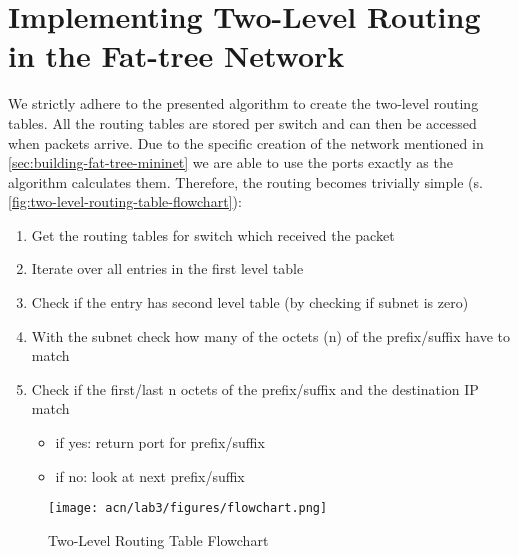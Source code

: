 \documentclass[a4paper,11pt]{article}
\newcommand{\note}[1]{\textit{\textcolor{gray}{#1}}}
\begin{document}
\section{Implementing Two-Level Routing in the Fat-tree Network}


We strictly adhere to the presented algorithm to create the two-level routing tables.
All the routing tables are stored per switch and can then be accessed when packets arrive.
Due to the specific creation of the network mentioned in \autoref{sec:building-fat-tree-mininet} we are able to use the ports exactly as the algorithm calculates them.
Therefore, the routing becomes trivially simple (s. \autoref{fig:two-level-routing-table-flowchart}):

\begin{enumerate}
    \item Get the routing tables for switch which received the packet
    \item Iterate over all entries in the first level table
    \item Check if the entry has second level table (by checking if subnet is zero)
    \item With the subnet check how many of the octets (n) of the prefix/suffix have to match
    \item Check if the first/last n octets of the prefix/suffix and the destination IP match
    \begin{itemize}
        \item if yes: return port for prefix/suffix
        \item if no: look at next prefix/suffix
    \end{itemize}
\end{enumerate}

\begin{figure}[ht]
    \centering
    \texttt{[image: acn/lab3/figures/flowchart.png]}
    \caption{Two-Level Routing Table Flowchart}
    \label{fig:two-level-routing-table-flowchart}
\end{figure}

\begin{comment}
Get the routing tables for switch which received the packet
  Iterate over all entries in the first level table
    Check if the entry has second level table
      subnet is zero
        yes - match prefix: first %
          [match] match: return port for prefix/suffix
          [nomatch] no match: look at next prefix/suffix
        no - match suffix: last %
          match: (match)
          no match: (nomatch)
\end{comment}
\end{document}
